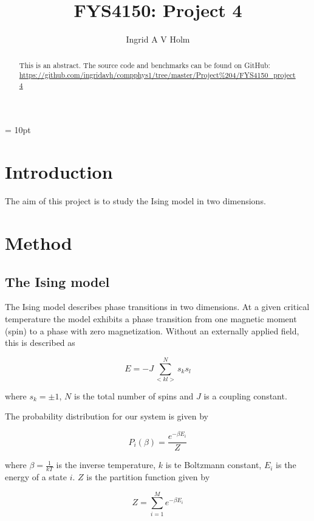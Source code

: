 \documentclass[11pt]{article}
\begin{document}
\title{FYS4150: Project 4}
\author{Ingrid A V Holm}
\maketitle


\marginparwidth = 10pt

\begin{abstract}
This is an abstract. The source code and benchmarks can be found on GitHub: \url{https://github.com/ingridavh/compphys1/tree/master/Project%204/FYS4150_project4}
\end{abstract}


\section{Introduction}

\begin{flushleft}
The aim of this project is to study the Ising model in two dimensions.
\end{flushleft}

\section{Method}

\subsection{The Ising model}

\begin{flushleft}
The Ising model describes phase transitions in two dimensions. At a given critical temperature the model exhibits a phase transition from one magnetic moment (spin) to a phase with zero magnetization. Without an externally applied field, this is described as

\begin{equation}
E = -J \sum^N_{<kl>} s_k s_l
\end{equation}

where $s_k = \pm 1$, $N$ is the total number of spins and $J$ is a coupling constant.


The probability distribution for our system is given by

\begin{equation}
P_i(\beta) = \frac{e^{- \beta E_i}}{Z}
\end{equation}

where $\beta = \frac{1}{kT}$ is the inverse temperature, $k$ is te Boltzmann constant, $E_i$ is the energy of a state $i$. $Z$ is the partition function given by

\begin{equation}\label{Partition function}
Z = \sum_{i=1}^M e^{- \beta E_i}
\end{equation}


\end{flushleft}
\end{document}
